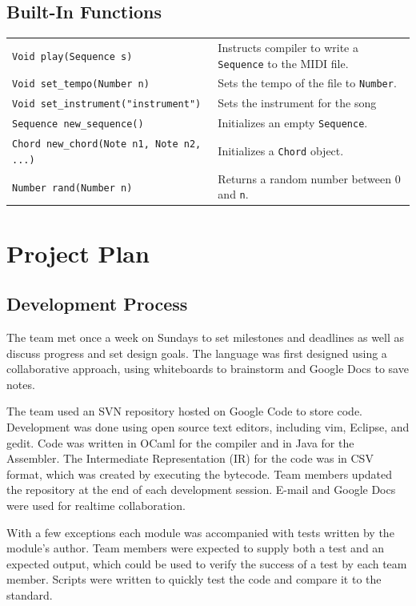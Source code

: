 \documentclass[12pt,A4]{book}
\begin{document}
\section{Built-In Functions}

\begin{tabular}{l p{}}
\verb|Void play(Sequence s)| & Instructs compiler to write a \verb|Sequence| to the MIDI file.\\
\verb|Void set_tempo(Number n)| & Sets the tempo of the file to \verb|Number|.\\
\verb|Void set_instrument("instrument")| & Sets the instrument for the song\\
\verb|Sequence new_sequence()| & Initializes an empty \verb|Sequence|.\\
\verb|Chord new_chord(Note n1, Note n2, ...)| & Initializes a \verb|Chord| object.\\
\verb|Number rand(Number n)| & Returns a random number between 0 and \verb|n|.\\
\end{tabular}

\chapter{Project Plan}
\section{Development Process}
The team met once a week on Sundays to set milestones and deadlines as well as discuss progress and set design goals. The language was first designed using a collaborative approach, using whiteboards to brainstorm and Google Docs to save notes.

The team used an SVN repository hosted on Google Code to store code. Development was done using open source text editors, including vim, Eclipse, and gedit. Code was written in OCaml for the compiler and in Java for the Assembler. The Intermediate Representation (IR) for the code was in CSV format, which was created by executing the bytecode. Team members updated the repository at the end of each development session. E-mail and Google Docs were used for realtime collaboration.

With a few exceptions each module was accompanied with tests written by the module's author. Team members were expected to supply both a test and an expected output, which could be used to verify the success of a test by each team member. Scripts were written to quickly test the code and compare it to the standard.
\end{document}
